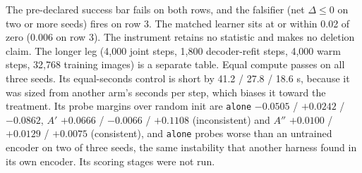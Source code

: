 \documentclass{article} %
\begin{document}
\noindent The pre-declared success bar fails on both rows, and the falsifier (net $\Delta\le0$ on two
or more seeds) fires on row 3. The matched learner sits at or within 0.02 of zero (0.006 on row 3).
The instrument retains no statistic and makes no deletion claim. %
The longer leg (4,000 joint steps, 1,800 decoder-refit steps, 4,000 warm steps, 32,768 training
images) is a separate table. Equal compute passes on all three seeds. Its equal-seconds control is
short by 41.2 / 27.8 / 18.6 s, because it was sized from another arm's seconds per step, which
biases it toward the treatment. Its probe margins over random init are \texttt{alone} $-0.0505$ / $+0.0242$ /
$-0.0862$, $A'$ $+0.0666$ / $-0.0066$ / $+0.1108$ (inconsistent) and $A''$ $+0.0100$ / $+0.0129$ /
$+0.0075$ (consistent), and \texttt{alone} probes worse than an untrained encoder on two of three
seeds, the same instability that another harness found in its own encoder. Its scoring stages were
not run. %
\end{document}
